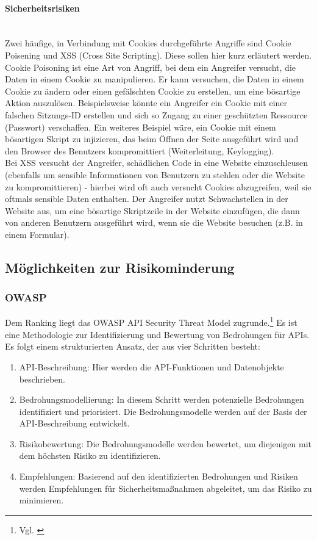 \documentclass[notitlepage, hidelinks]{article}
\begin{document}
\paragraph{Sicherheitsrisiken} \mbox{} \\
Zwei häufige, in Verbindung mit Cookies durchgeführte Angriffe sind Cookie Poisening und XSS (Cross Site Scripting). Diese sollen hier kurz erläutert werden. \\

Cookie Poisoning ist eine Art von Angriff, bei dem ein Angreifer versucht, die Daten in einem Cookie zu manipulieren. Er kann versuchen, die Daten in einem Cookie zu ändern oder einen gefälschten Cookie zu erstellen, um eine bösartige Aktion auszulösen. Beispielsweise könnte ein Angreifer ein Cookie mit einer falschen Sitzungs-ID erstellen und sich so Zugang zu einer geschützten Ressource (Passwort) verschaffen. Ein weiteres Beispiel wäre, ein Cookie mit einem bösartigen Skript zu injizieren, das beim Öffnen der Seite ausgeführt wird und den Browser des Benutzers kompromittiert (Weiterleitung, Keylogging). \\

Bei XSS versucht der Angreifer, schädlichen Code in eine Website einzuschleusen (ebenfalls um sensible Informationen von Benutzern zu stehlen oder die Website zu kompromittieren) - hierbei wird oft auch versucht Cookies abzugreifen, weil sie oftmals sensible Daten enthalten. Der Angreifer nutzt Schwachstellen in der Website aus, um eine bösartige Skriptzeile in der Website einzufügen, die dann von anderen Benutzern ausgeführt wird, wenn sie die Website besuchen (z.B. in einem Formular).

\subsection{Möglichkeiten zur Risikominderung}
\subsubsection{OWASP}

Dem Ranking liegt das OWASP API Security Threat Model zugrunde.\footnote{Vgl. \cite{api-owasp}} Es ist eine Methodologie zur Identifizierung und Bewertung von Bedrohungen für APIs. Es folgt einem strukturierten Ansatz, der aus vier Schritten besteht:
\begin{enumerate}
\item API-Beschreibung: Hier werden die API-Funktionen und Datenobjekte beschrieben.
\item Bedrohungsmodellierung: In diesem Schritt werden potenzielle Bedrohungen identifiziert und priorisiert. Die Bedrohungsmodelle werden auf der Basis der API-Beschreibung entwickelt.
\item Risikobewertung: Die Bedrohungsmodelle werden bewertet, um diejenigen mit dem höchsten Risiko zu identifizieren.
\item Empfehlungen: Basierend auf den identifizierten Bedrohungen und Risiken werden Empfehlungen für Sicherheitsmaßnahmen abgeleitet, um das Risiko zu minimieren.
\end{enumerate}
\end{document}
